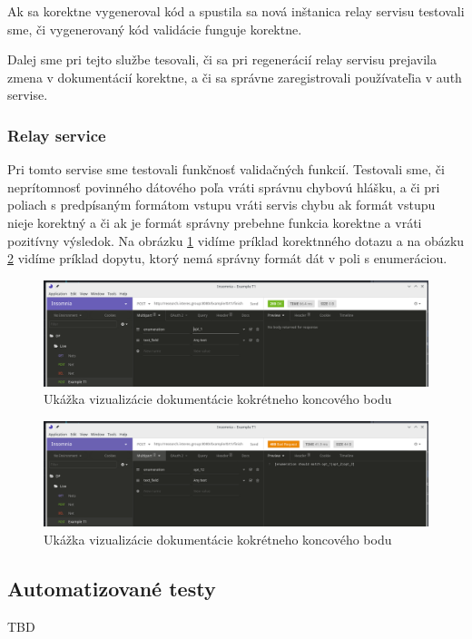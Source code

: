 Ak sa korektne vygeneroval kód a spustila sa nová inštanica relay servisu testovali sme, či vygenerovaný kód validácie funguje korektne.

Dalej sme pri tejto službe tesovali, či sa pri regenerácií relay servisu prejavila zmena v dokumentácií korektne, a či sa správne zaregistrovali používateľia v auth servise.


\subsubsection{Relay service}
Pri tomto servise sme testovali funkčnosť validačných funkcií. Testovali sme, či neprítomnosť povinného dátového poľa vráti správnu chybovú hlášku, a či pri poliach s predpísaným formátom vstupu vráti servis chybu ak formát vstupu nieje korektný a či ak je formát správny prebehne funkcia korektne a vráti pozitívny výsledok. Na obrázku \ref{insomnia_200} vidíme príklad korektnného dotazu a na obázku \ref{insomnia_400} vidíme príklad dopytu, ktorý nemá správny formát dát v poli s enumeráciou. 

\begin{figure}[!htbp] 
	\centering 
	\includegraphics[width=16cm]{img/insomnia_200.png} 
	\caption{Ukážka vizualizácie dokumentácie kokrétneho koncového bodu} 
	\label{insomnia_200} 
\end{figure}

\begin{figure}[!htbp] 
	\centering 
	\includegraphics[width=16cm]{img/insomnia_400.png} 
	\caption{Ukážka vizualizácie dokumentácie kokrétneho koncového bodu} 
	\label{insomnia_400} 
\end{figure}




\subsection{Automatizované testy}

TBD


